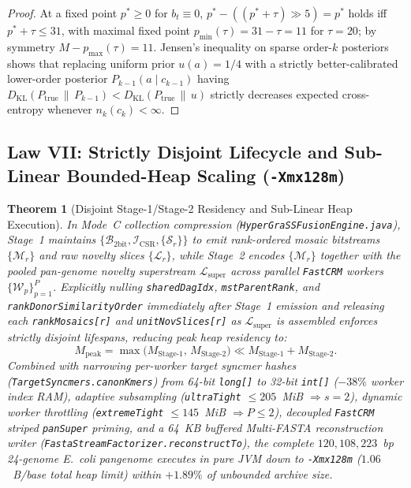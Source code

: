 \documentclass[10pt]{article}
\newtheorem{theorem}{Theorem}
\theoremstyle{definition}
\begin{document}
\begin{proof}
At a fixed point $p^* \ge 0$ for $b_t \equiv 0$, $p^* - ((p^* + \tau) \gg 5) = p^*$ holds iff $p^* + \tau \le 31$, with maximal fixed point $p_{\min}(\tau) = 31 - \tau = 11$ for $\tau = 20$; by symmetry $M - p_{\max}(\tau) = 11$. Jensen's inequality on sparse order-$k$ posteriors shows that replacing uniform prior $u(a)=1/4$ with a strictly better-calibrated lower-order posterior $P_{k-1}(a \mid c_{k-1})$ having $D_{\mathrm{KL}}(P_{\text{true}} \,\|\, P_{k-1}) < D_{\mathrm{KL}}(P_{\text{true}} \,\|\, u)$ strictly decreases expected cross-entropy whenever $n_k(c_k) < \infty$.
\end{proof}

\subsection{Law VII: Strictly Disjoint Lifecycle and Sub-Linear Bounded-Heap Scaling (\texttt{-Xmx128m})}

\begin{theorem}[Disjoint Stage-1/Stage-2 Residency and Sub-Linear Heap Execution]
\label{thm:law7}
In Mode~C collection compression (\texttt{HyperGraSSFusionEngine.java}), Stage~1 maintains $\{\mathcal{B}_{\text{2bit}}, \mathcal{I}_{\text{CSR}}, \{\mathcal{S}_r\}\}$ to emit rank-ordered mosaic bitstreams $\{\mathcal{M}_r\}$ and raw novelty slices $\{\mathcal{L}_r\}$, while Stage~2 encodes $\{\mathcal{M}_r\}$ together with the pooled pan-genome novelty superstream $\mathcal{L}_{\text{super}}$ across parallel \texttt{FastCRM} workers $\{\mathcal{W}_p\}_{p=1}^P$. Explicitly nulling \texttt{sharedDagIdx}, \texttt{mstParentRank}, and \texttt{rankDonorSimilarityOrder} immediately after Stage~1 emission and releasing each \texttt{rankMosaics[r]} and \texttt{unitNovSlices[r]} as $\mathcal{L}_{\text{super}}$ is assembled enforces strictly disjoint lifespans, reducing peak heap residency to:
\begin{equation}
  M_{\text{peak}} = \max\!\big(M_{\text{Stage-1}},\, M_{\text{Stage-2}}\big) \ll M_{\text{Stage-1}} + M_{\text{Stage-2}}.
\end{equation}
Combined with narrowing per-worker target syncmer hashes (\texttt{TargetSyncmers.canonKmers}) from 64-bit \texttt{long[]} to 32-bit \texttt{int[]} ($-38\%$ worker index RAM), adaptive subsampling (\texttt{ultraTight} $\le 205$~MiB $\Rightarrow s=2$), dynamic worker throttling (\texttt{extremeTight} $\le 145$~MiB $\Rightarrow P \le 2$), decoupled \texttt{FastCRM} striped \texttt{panSuper} priming, and a 64~KB buffered Multi-FASTA reconstruction writer (\texttt{FastaStreamFactorizer.reconstructTo}), the complete $120,108,223$~bp 24-genome \textit{E.~coli} pangenome executes in pure JVM down to \texttt{-Xmx128m} ($1.06$~B/base total heap limit) within $+1.89\%$ of unbounded archive size.
\end{theorem}
\end{document}
